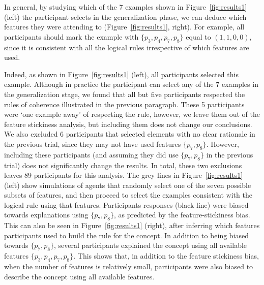 In general, by studying which of the 7 examples shown in Figure~\ref{fig:results1} (left) the participant selects in the generalization phase, we can deduce which features they were attending to (Figure~\ref{fig:results1}, right). For example, all participants should mark the example with $\{p_3,p_4,p_7,p_8\}$ equal to $(1,1,0,0)$, since it is consistent with all the logical rules irrespective of which features are used. 

Indeed, as shown in Figure~\ref{fig:results1} (left), all participants selected this example. Although in practice the participant can select any of the 7 examples in the generalization stage, we found that all but five participants respected the rules of coherence illustrated in the previous paragraph. These 5 participants were `one example away' of respecting the rule, however, we leave them out of the feature stickiness analysis, but including them does not change our conclusions. We also excluded 6 participants that selected elements with no clear rationale in the previous trial, since they may not have used features $\{p_7,p_8\}$. However, including these participants (and assuming they did use $\{p_7,p_8\}$ in the previous trial) does not significantly change the results. In total, these two exclusions leaves 89 participants for this analysis. The grey lines in Figure~\ref{fig:results1} (left) show simulations of agents that randomly select one of the seven possible subsets of features, and then proceed to select the examples consistent with the logical rule using that features. Participants responses (black line) were biased towards explanations using $\{p_7,p_8\}$, as predicted by the feature-stickiness bias. This can also be seen in  Figure~\ref{fig:results1} (right), after inferring which features participants used to build the rule for the concept. In addition to being biased towards $\{p_7,p_8\}$, several participants explained the concept using all available features $\{p_3,p_4,p_7,p_8\}$. This shows that, in addition to the feature stickiness bias, when the number of features is relatively small, participants were also biased to describe the concept using all available features.

